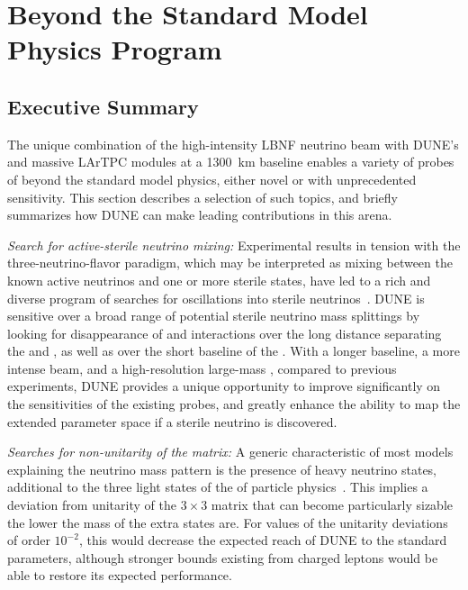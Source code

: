 \chapter{Beyond the Standard Model  Physics Program }
\label{ch:bsm}
\section{Executive Summary}
\label{phys:bsm:execsumm}

The unique combination of the high-intensity LBNF neutrino beam with DUNE's   and massive LArTPC  modules at a \SI{1300}{km} baseline enables a variety of probes of beyond the standard model  physics, either novel or with unprecedented sensitivity. This section describes a selection of such topics, and briefly summarizes how DUNE can make leading contributions in this arena.

\textit{Search for active-sterile neutrino mixing:} Experimental results in tension with the three-neutrino-flavor paradigm, which may be interpreted as mixing between the known active neutrinos and one or more sterile states, have led to a rich and diverse program of searches for oscillations into sterile neutrinos~\cite{ref:tension,Gariazzo:2017fdh}. DUNE is sensitive over a broad range of potential sterile neutrino mass splittings by looking for disappearance of  and   interactions over the long distance separating the  and , as well as over the short baseline of the  . With a longer baseline, a more intense beam, and a high-resolution large-mass , compared to previous experiments, DUNE provides a unique opportunity to improve significantly on the sensitivities of the existing probes, and greatly enhance the ability to map the extended parameter space if a sterile neutrino is discovered.

\textit{Searches for non-unitarity of the  matrix:} A generic characteristic of most models explaining the neutrino mass pattern is the presence of heavy neutrino states, additional to the three light states of the  of particle physics~\cite{Minkowski:1977sc,Mohapatra:1979ia,Yanagida:1979as,GellMann:1980vs}. This implies a deviation from %
unitarity of the $3 \times 3$  matrix that can %
become particularly sizable the lower the mass of the extra states are.
For values of the unitarity deviations of order $10^{-2}$, this would decrease the expected reach of DUNE to the standard parameters, although stronger bounds existing from charged leptons would be able to restore its expected performance.

